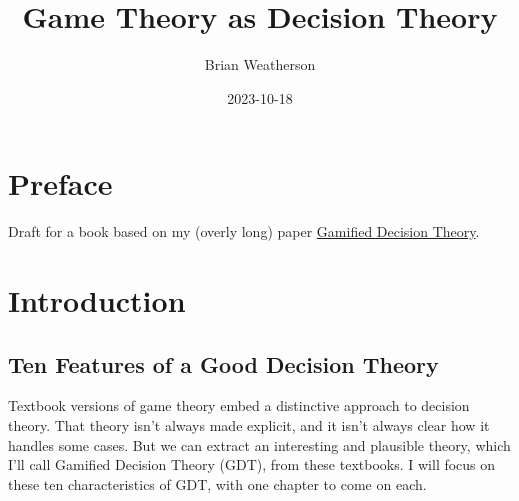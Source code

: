 \documentclass[
  12pt,
  letterpaper,
  DIV=11,
  numbers=noendperiod]{scrreprt}
\title{Game Theory as Decision Theory}
\author{Brian Weatherson}
\date{2023-10-18}
\renewcommand*\contentsname{Table of contents}
\newcommand\contentsname{Table of contents}
\begin{document}
\maketitle
\ifdefined\Shaded\renewenvironment{Shaded}{\begin{tcolorbox}[interior hidden, borderline west={3pt}{0pt}{shadecolor}, breakable, frame hidden, enhanced, boxrule=0pt, sharp corners]}{\end{tcolorbox}}\fi

\renewcommand*\contentsname{Table of contents}
{
\hypersetup{linkcolor=}
\setcounter{tocdepth}{2}
\tableofcontents
}

\hypertarget{preface}{%
\chapter*{Preface}\label{preface}}


Draft for a book based on my (overly long) paper
\href{https://brian.weatherson.org/gdt/gdt.html}{Gamified Decision
Theory}.


\hypertarget{sec-intro}{%
\chapter{Introduction}\label{sec-intro}}

\hypertarget{sec-ten-features}{%
\section{Ten Features of a Good Decision
Theory}\label{sec-ten-features}}

Textbook versions of game theory embed a distinctive approach to
decision theory. That theory isn't always made explicit, and it isn't
always clear how it handles some cases. But we can extract an
interesting and plausible theory, which I'll call Gamified Decision
Theory (GDT), from these textbooks. I will focus on these ten
characteristics of GDT, with one chapter to come on each.
\end{document}
